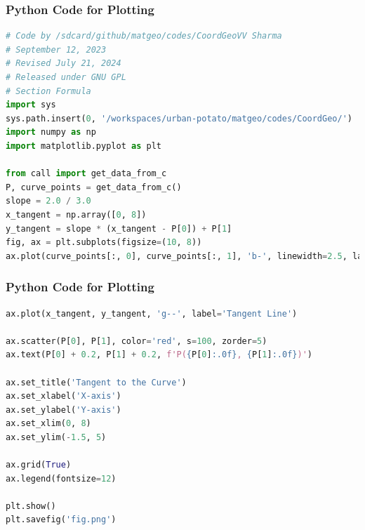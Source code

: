\documentclass{beamer}
\theoremstyle{remark}
\numberwithin{equation}{section}
\begin{document}
\begin{frame}[fragile]
\frametitle{Python Code for Plotting}
\begin{lstlisting}[language=Python]
# Code by /sdcard/github/matgeo/codes/CoordGeoVV Sharma
# September 12, 2023
# Revised July 21, 2024
# Released under GNU GPL
# Section Formula
import sys
sys.path.insert(0, '/workspaces/urban-potato/matgeo/codes/CoordGeo/') 
import numpy as np
import matplotlib.pyplot as plt

from call import get_data_from_c
P, curve_points = get_data_from_c()
slope = 2.0 / 3.0
x_tangent = np.array([0, 8])
y_tangent = slope * (x_tangent - P[0]) + P[1]
fig, ax = plt.subplots(figsize=(10, 8))
ax.plot(curve_points[:, 0], curve_points[:, 1], 'b-', linewidth=2.5, label='Curve: $y = \\sqrt{4x-3} - 1$')

\end{lstlisting}
\end{frame}
\begin{frame}[fragile]
\frametitle{Python Code for Plotting}
\begin{lstlisting}[language=Python]
ax.plot(x_tangent, y_tangent, 'g--', label='Tangent Line')

ax.scatter(P[0], P[1], color='red', s=100, zorder=5)
ax.text(P[0] + 0.2, P[1] + 0.2, f'P({P[0]:.0f}, {P[1]:.0f})')

ax.set_title('Tangent to the Curve')
ax.set_xlabel('X-axis')
ax.set_ylabel('Y-axis')
ax.set_xlim(0, 8)
ax.set_ylim(-1.5, 5)

ax.grid(True)
ax.legend(fontsize=12)

plt.show()
plt.savefig('fig.png')
           
\end{lstlisting}
\end{frame}
 
\end{document}
